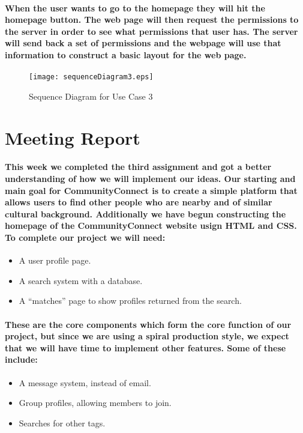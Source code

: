 \documentclass[12pt]{article}
\begin{document}
    \paragraph{\normalfont \indent When the user wants to go to the homepage they will hit the homepage button. The web page will then request the permissions to the server in order to see what permissions that user has. The server will send back a set of permissions and the webpage will use that information to construct a basic layout for the web page.
    }

      \begin{figure}[H]
              \texttt{[image: sequenceDiagram3.eps]}
              \caption{Sequence Diagram for Use Case 3}
              \label{fig: Sequence Diagram 3}
      \end{figure}

\section{\bf Meeting Report}
  \paragraph{\normalfont \indent This week we completed the third assignment and got a better understanding of how we will implement our ideas. Our starting and main goal for CommunityConnect is to create a simple platform that allows users to find other people who are nearby and of similar cultural background. Additionally we have begun constructing the homepage of the CommunityConnect website usign HTML and CSS. To complete our project we will need:
  }
   \begin{itemize}
    \item A user profile page.
    \item A search system with a database.
    \item A “matches” page to show profiles returned from the search.
   \end{itemize}

  \paragraph{\normalfont \indent These are the core components which form the core function of our project, but since we are using a spiral production style, we expect that we will have time to implement other features. Some of these include:
  }
   \begin{itemize}
    \item A message system, instead of email.
    \item Group profiles, allowing members to join.
    \item Searches for other tags.
   \end{itemize}
\end{document}
